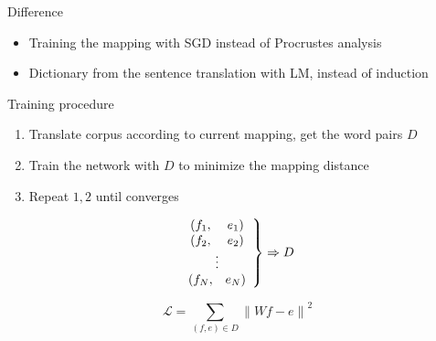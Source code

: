 \documentclass[11pt, a4paper, landscape]{article}
\begin{document}
	
	\NewPage
	\vfill
	Difference
	\begin{itemize}
		\item Training the mapping with SGD instead of Procrustes analysis
		\item Dictionary from the sentence translation with LM, instead of induction\\
	\end{itemize}
	Training procedure
	\begin{enumerate}
		\item Translate corpus according to current mapping, get the word pairs $D$
		\item Train the network with $D$ to minimize the mapping distance
		\item Repeat $1,2$ until converges
	\end{enumerate}

	\begin{minipage}[b]{0.5\textwidth}
		\[ 
		\left. \begin{array}{c c} 
		(f_1,& e_1)\\
		(f_2,& e_2)\\
		\multicolumn{2}{c}{\vdots}\\
		(f_N,& e_N)
		\end{array} \right\} 
		\Rightarrow D
		\]
		
	\end{minipage}
	\begin{minipage}[b]{0.3\textwidth}
		\[\mathcal{L} = \sum_{(f,e)\in D} {\lVert Wf - e \rVert}^2  \]
	\end{minipage}
	\vfill	

	\FinalPage
	

	
	
	\NewPage
	
	
	
\end{document}
